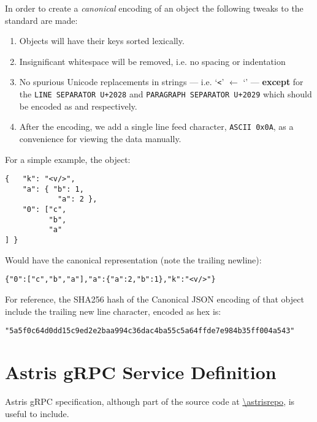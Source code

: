 In order to create a \emph{canonical} encoding of an object the following tweaks to the standard are made:

\begin{enumerate}
    \item Objects will have their keys sorted lexically.
    \item Insignificant whitespace will be removed, i.e. no spacing or indentation
    \item No spurious Unicode replacements in strings --- i.e. `\texttt{<}' $\leftarrow$ `\texttt{}' --- \textbf{except} for the \texttt{LINE SEPARATOR U+2028} and \texttt{PARAGRAPH SEPARATOR U+2029} which should be encoded as \texttt{} and \texttt{} respectively.
    \item After the encoding, we add a single line feed character, \texttt{ASCII 0x0A}, as a convenience for viewing the data manually.
\end{enumerate}

For a simple example, the object:

\begin{lstlisting}[style=ES6]
{   "k": "<v/>",
    "a": { "b": 1,
            "a": 2 },
    "0": ["c",
          "b",
          "a"
] }
\end{lstlisting}

Would have the canonical representation (note the trailing newline):

\begin{lstlisting}[style=ES6]
{"0":["c","b","a"],"a":{"a":2,"b":1},"k":"<v/>"}

\end{lstlisting}

For reference, the SHA256 hash of the Canonical JSON encoding of that object include the trailing new line character, encoded as hex is:

\begin{lstlisting}[style=ES6]
"5a5f0c64d0dd15c9ed2e2baa994c36dac4ba55c5a64ffde7e984b35ff004a543"
\end{lstlisting}

\chapter{Astris gRPC Service Definition}

Astris gRPC specification, although part of the source code at \scriptsize{\url{\astrisrepo}}, is useful to include.






